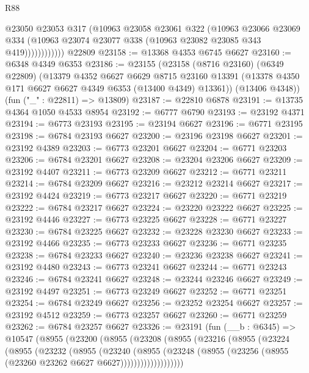 \begin{lexlean}{R88}
\begin{coremodule}
                    @23050
                    @23053
                    @317
                    (@10963
                      @23058
                      @23061
                      @322
                      (@10963
                        @23066
                        @23069
                        @334
                        (@10963 @23074 @23077 @338 (@10963 @23082 @23085 @343 @419))))))))))))
    @22809
@23158 := @13368 @4353 @6745 @6627
@23160 := @6348 @4349 @6353
@23186 := @23155
    (@23158
      (@8716 @23160)
      (@6349 @22809)
      (@13379
        @4352
        @6627
        @6629
        @8715
        @23160
        @13391
        (@13378 @4350 @171 @6627 @6627 @4349 @6353 (@13400 @4349) @13361))
      (@13406 @4348))
    (fun ("_" : @22811) => @13809)
@23187 := @22810 @6878
@23191 := @13735 @4364 @1050 @4533 @8954
@23192 := @6777 @6790
@23193 := @23192 @4371
@23194 := @6773 @23193
@23195 := @23194 @6627
@23196 := @6771 @23195
@23198 := @6784 @23193 @6627
@23200 := @23196 @23198 @6627
@23201 := @23192 @4389
@23203 := @6773 @23201 @6627
@23204 := @6771 @23203
@23206 := @6784 @23201 @6627
@23208 := @23204 @23206 @6627
@23209 := @23192 @4407
@23211 := @6773 @23209 @6627
@23212 := @6771 @23211
@23214 := @6784 @23209 @6627
@23216 := @23212 @23214 @6627
@23217 := @23192 @4424
@23219 := @6773 @23217 @6627
@23220 := @6771 @23219
@23222 := @6784 @23217 @6627
@23224 := @23220 @23222 @6627
@23225 := @23192 @4446
@23227 := @6773 @23225 @6627
@23228 := @6771 @23227
@23230 := @6784 @23225 @6627
@23232 := @23228 @23230 @6627
@23233 := @23192 @4466
@23235 := @6773 @23233 @6627
@23236 := @6771 @23235
@23238 := @6784 @23233 @6627
@23240 := @23236 @23238 @6627
@23241 := @23192 @4480
@23243 := @6773 @23241 @6627
@23244 := @6771 @23243
@23246 := @6784 @23241 @6627
@23248 := @23244 @23246 @6627
@23249 := @23192 @4497
@23251 := @6773 @23249 @6627
@23252 := @6771 @23251
@23254 := @6784 @23249 @6627
@23256 := @23252 @23254 @6627
@23257 := @23192 @4512
@23259 := @6773 @23257 @6627
@23260 := @6771 @23259
@23262 := @6784 @23257 @6627
@23326 := @23191
    (fun (__b : @6345) =>
    @10547
      (@8955
        (@23200
          (@8955
            (@23208
              (@8955
                (@23216
                  (@8955
                    (@23224
                      (@8955
                        (@23232
                          (@8955
                            (@23240
                              (@8955
                                (@23248
                                  (@8955
                                    (@23256 (@8955 (@23260 @23262 @6627 @6627)))))))))))))))))))

\end{coremodule}
\end{lexlean}
